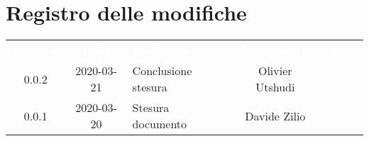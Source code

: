 \section*{Registro delle modifiche}
{
	\centering
	\begin{longtable}{ c c  C{4cm}  c  c }
		\textcolor{white}{\textbf{Versione}} & \textcolor{white}{\textbf{Data}} & \textcolor{white}{\textbf{Descrizione}} & \textcolor{white}{\textbf{Nominativo}} & \textcolor{white}{\textbf{Ruolo}}\\		
		0.0.2 & 2020-03-21 & Conclusione stesura & Olivier Utshudi &\reda{}\\
		0.0.1 & 2020-03-20 & Stesura documento & Davide Zilio &\reda{}\\		
		
	\end{longtable}

}